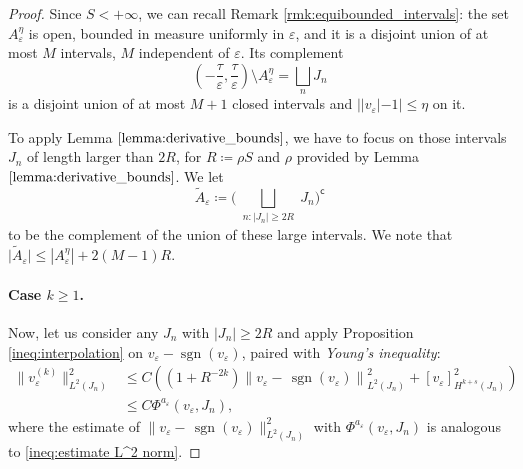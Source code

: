 \documentclass{article}
\theoremstyle{definition}
\newcommand{\norm}[1]{\left\lVert #1 \right\rVert}
\newcommand{\e}{\varepsilon}
\def\e{\varepsilon}
\newcommand{\sgn}{\operatorname{sgn}}
\begin{document}
\begin{proof} 
    Since $S<+\infty$, we can recall Remark \ref{rmk:equibounded_intervals}: the set $A^\eta_\e$  is open, bounded in measure uniformly in $\e$, and it is a disjoint union of at most $M$ intervals, $M$ independent of $\e$. Its complement 
    \[\left(-\frac{\tau}{\e},\frac{\tau}{\e}\right)\setminus A^\eta_\e=\bigsqcup_{n}J_n\]
    is a disjoint union of at most $M+1$ closed intervals and $||v_\e|-1|\leq \eta$ on it.
        
    To apply Lemma $\ref{lemma:derivative_bounds}$, we have to focus on those intervals $J_n$ of length larger than $2R$, for $R\coloneqq\rho S$ and $\rho$ provided by Lemma $\ref{lemma:derivative_bounds}$. We let
    \begin{equation*}
        \widetilde{A}_\e\coloneqq \Big(\bigsqcup_{\substack{
       n\colon |J_n|\ge 2R}}J_n\Big)^{\mathsf c}
    \end{equation*}
    to be the complement of the union of these large intervals. We note that $\big|\widetilde{A}_\e\big|\leq |A^\eta_\e|+ 2(M-1)R$.
    
    \paragraph{Case $k\geq 1$.} Now, let us consider any $J_n$ with $|J_n|\geq 2R$ and apply Proposition \ref{ineq:interpolation} on $v_\e-\sgn(v_\e)$, paired with \emph{Young's inequality}:
    \begin{align}\label{eq:large_intervals_estimate}
        \|v_\e^{(k)}\|_{L^2(J_n)}^2 &\leq C\left((1 +R^{-2k})\norm{v_\e-\,\sgn(v_\e)}^2_{L^2(J_n)} + [v_\e]_{H^{k+s}(J_n)}^2\right)\\
        & \leq C\Phi^{a_{\scriptstyle \e}}(v_\e,J_n),\nonumber
    \end{align}
    where the estimate of $\|v_\e-\,\sgn(v_\e)\|^2_{L^2(J_n)}$ with $\Phi^{a_{\scriptstyle \e}}(v_\e,J_n)$ is analogous to \eqref{ineq:estimate L^2 norm}. 
    

\end{proof}
\end{document}
